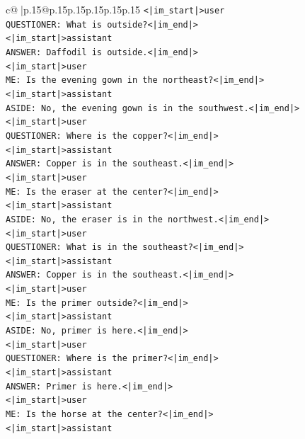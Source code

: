 \documentclass{article}
\begin{document}
{\begin{supertabular}{c@{$\;$}|p{.15\linewidth}@{}p{.15\linewidth}p{.15\linewidth}p{.15\linewidth}p{.15\linewidth}p{.15\linewidth}}
{{{\texttt{<|im\_start|>user} \\
\texttt{QUESTIONER: What is outside?<|im\_end|>} \\
\texttt{<|im\_start|>assistant} \\
\texttt{ANSWER: Daffodil is outside.<|im\_end|>} \\
\texttt{<|im\_start|>user} \\
\texttt{ME: Is the evening gown in the northeast?<|im\_end|>} \\
\texttt{<|im\_start|>assistant} \\
\texttt{ASIDE: No, the evening gown is in the southwest.<|im\_end|>} \\
\texttt{<|im\_start|>user} \\
\texttt{QUESTIONER: Where is the copper?<|im\_end|>} \\
\texttt{<|im\_start|>assistant} \\
\texttt{ANSWER: Copper is in the southeast.<|im\_end|>} \\
\texttt{<|im\_start|>user} \\
\texttt{ME: Is the eraser at the center?<|im\_end|>} \\
\texttt{<|im\_start|>assistant} \\
\texttt{ASIDE: No, the eraser is in the northwest.<|im\_end|>} \\
\texttt{<|im\_start|>user} \\
\texttt{QUESTIONER: What is in the southeast?<|im\_end|>} \\
\texttt{<|im\_start|>assistant} \\
\texttt{ANSWER: Copper is in the southeast.<|im\_end|>} \\
\texttt{<|im\_start|>user} \\
\texttt{ME: Is the primer outside?<|im\_end|>} \\
\texttt{<|im\_start|>assistant} \\
\texttt{ASIDE: No, primer is here.<|im\_end|>} \\
\texttt{<|im\_start|>user} \\
\texttt{QUESTIONER: Where is the primer?<|im\_end|>} \\
\texttt{<|im\_start|>assistant} \\
\texttt{ANSWER: Primer is here.<|im\_end|>} \\
\texttt{<|im\_start|>user} \\
\texttt{ME: Is the horse at the center?<|im\_end|>} \\
\texttt{<|im\_start|>assistant} \\
}}}
\end{supertabular}}
\end{document}
